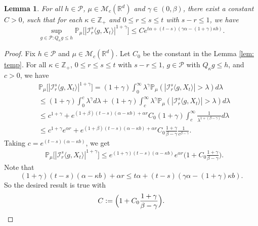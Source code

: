 \documentclass[12pt]{amsart}
\theoremstyle{plain}
\newtheorem{lem}[thm]{Lemma}
\theoremstyle{definition}
\numberwithin{equation}{section}
\begin{document}
\begin{lem}
\label{lem: control of mgtrs}
	For all $h \in \mathcal P$, $\mu \in \mathcal M_c(\mathbb{R}^d)$ and $\gamma\in (0, \beta)$, there exist a constant $C > 0$, such that for each $\kappa \in \mathbb Z_+$ and $0\leq r\leq s\leq t$ with $s-r \leq 1$, we have
\[
    \sup_{g \in \mathcal P: Q_\kappa g\leq h} \mathbb P_\mu\big[|\mathcal I_r^s\langle g, X_t\rangle|^{1+\gamma}\big]
    \leq C e^{t\alpha+(t-s) (\gamma\alpha- (1+\gamma)\kappa b)}.
\]
\end{lem}

\begin{proof}
	Fix $h \in \mathcal P$ and $\mu \in \mathcal M_c(\mathbb R^d)$. Let $C_0$ be the constant in the Lemma \ref{lem: temp}.
    For all $\kappa \in \mathbb Z_+$,  $0\leq r\leq s\leq t$ with $s-r \leq 1$,  $g\in \mathcal P$ with $Q_{\kappa} g \leq h$, and $c>0$, we have
\begin{align}
    &\mathbb P_\mu\big[|\mathcal I_r^s\langle g, X_t\rangle|^{1+\gamma}\big]
    = (1+\gamma)\int_0^\infty \lambda^{\gamma} \mathbb P_{\mu}(|\mathcal I_r^s\langle g, X_t\rangle|>\lambda) d\lambda
    \\&\leq (1+\gamma)\int_0^c \lambda^{\gamma} d\lambda +(1+\gamma)\int_c^\infty \lambda^{\gamma}\mathbb P_\mu(|\mathcal I_r^s\langle g, X_t\rangle|> \lambda) d\lambda
    \\& \leq c^{1+\gamma} + e^{(1+\beta)(t-s)(\alpha- \kappa b) + \alpha r} C_0  (1+\gamma)\int_c^\infty \frac{1}{\lambda^{1+(\beta-\gamma)}}d\lambda
    \\&\leq c^{1+\gamma} e^{\alpha r} + e^{(1+\beta)(t-s)(\alpha- \kappa b) + \alpha r} C_0   \frac{1+\gamma}{\beta - \gamma} \frac{1}{c^{\beta - \gamma}}.
\end{align}
    Taking $c = e^{(t-s)(\alpha- \kappa b)}$, we get
\begin{align}
    &\mathbb P_\mu\big[|\mathcal I_r^s\langle g, X_t\rangle|^{1+\gamma}\big]
    \leq e^{(1+\gamma)(t-s)(\alpha- \kappa b)} e^{\alpha r}\Big(1+ C_0 \frac{1+\gamma}{\beta - \gamma}\Big).
\end{align}
    Note that
\[
    (1+\gamma)(t-s)(\alpha- \kappa b) + \alpha r
    \leq t\alpha+(t-s) (\gamma\alpha- (1+\gamma)\kappa b).
\]
	So the desired result is true with
\[
	C := \Big(1+ C_0 \frac{1+\gamma}{\beta - \gamma}\Big).
	\qedhere
\]
\end{proof}
\end{document}
